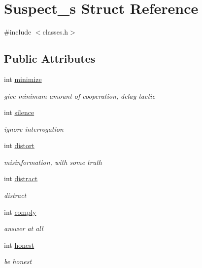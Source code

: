\hypertarget{struct_suspect__s}{\section{Suspect\+\_\+s Struct Reference}
\label{struct_suspect__s}
}


{\ttfamily \#include $<$classes.\+h$>$}

\subsection*{Public Attributes}
\begin{DoxyCompactItemize}
\item 
int \hyperlink{struct_suspect__s_a0bdb6fa57ffea54acd294d24b749fb95}{minimize}
\begin{DoxyCompactList}\small\item\em give minimum amount of cooperation, delay tactic \end{DoxyCompactList}\item 
int \hyperlink{struct_suspect__s_a2bb8b0ca3470b4dfb856f631b7ac5da0}{silence}
\begin{DoxyCompactList}\small\item\em ignore interrogation \end{DoxyCompactList}\item 
int \hyperlink{struct_suspect__s_aa3f819eebfe94a0a230be569ddab0d52}{distort}
\begin{DoxyCompactList}\small\item\em misinformation, with some truth \end{DoxyCompactList}\item 
int \hyperlink{struct_suspect__s_a2d2d292796fa66c5fa553cb55beb8131}{distract}
\begin{DoxyCompactList}\small\item\em distract \end{DoxyCompactList}\item 
int \hyperlink{struct_suspect__s_a8f5208d18939f62750ffe03a479023ff}{comply}
\begin{DoxyCompactList}\small\item\em answer at all \end{DoxyCompactList}\item 
int \hyperlink{struct_suspect__s_a20774be3bfbe97a7ff6de44ebf7c324d}{honest}
\begin{DoxyCompactList}\small\item\em be honest \end{DoxyCompactList}\item 

\end{DoxyCompactItemize}
